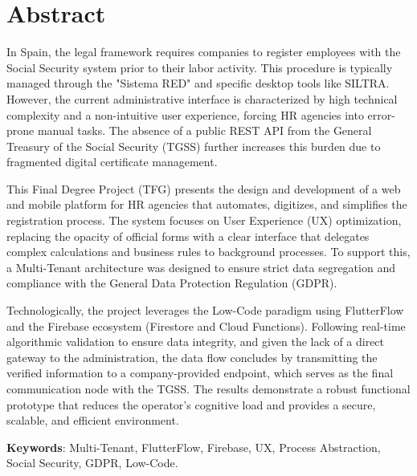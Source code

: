 \chapter*{Abstract}
In Spain, the legal framework requires companies to register employees with the Social Security system prior to their labor activity. This procedure is typically managed through the "Sistema RED" and specific desktop tools like SILTRA. However, the current administrative interface is characterized by high technical complexity and a non-intuitive user experience, forcing HR agencies into error-prone manual tasks. The absence of a public REST API from the General Treasury of the Social Security (TGSS) further increases this burden due to fragmented digital certificate management.

This Final Degree Project (TFG) presents the design and development of a web and mobile platform for HR agencies that automates, digitizes, and simplifies the registration process. The system focuses on User Experience (UX) optimization, replacing the opacity of official forms with a clear interface that delegates complex calculations and business rules to background processes. To support this, a Multi-Tenant architecture was designed to ensure strict data segregation and compliance with the General Data Protection Regulation (GDPR).

Technologically, the project leverages the Low-Code paradigm using FlutterFlow and the Firebase ecosystem (Firestore and Cloud Functions). Following real-time algorithmic validation to ensure data integrity, and given the lack of a direct gateway to the administration, the data flow concludes by transmitting the verified information to a company-provided endpoint, which serves as the final communication node with the TGSS. The results demonstrate a robust functional prototype that reduces the operator's cognitive load and provides a secure, scalable, and efficient environment.

\textbf{Keywords}: Multi-Tenant, FlutterFlow, Firebase, UX, Process Abstraction, Social Security, GDPR, Low-Code.